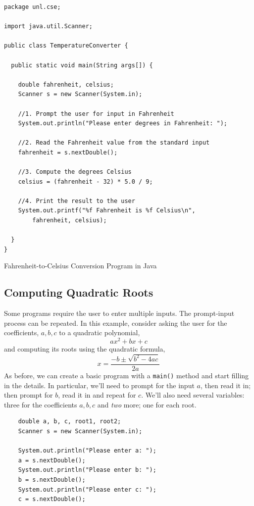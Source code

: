 \begin{listing}[!h]
\begin{verbatim}
package unl.cse;

import java.util.Scanner;

public class TemperatureConverter {

  public static void main(String args[]) {

    double fahrenheit, celsius;
    Scanner s = new Scanner(System.in);

    //1. Prompt the user for input in Fahrenheit
    System.out.println("Please enter degrees in Fahrenheit: ");
      
    //2. Read the Fahrenheit value from the standard input
    fahrenheit = s.nextDouble();
      
    //3. Compute the degrees Celsius
    celsius = (fahrenheit - 32) * 5.0 / 9;
      
    //4. Print the result to the user
    System.out.printf("%f Fahrenheit is %f Celsius\n", 
    	fahrenheit, celsius);

  }
}
\end{verbatim}
\caption{Fahrenheit-to-Celsius Conversion Program in Java}
\label{code:java:fahrenheitToCelsiusProgram}
\end{listing}

\subsection{Computing Quadratic Roots}

Some programs require the user to enter multiple inputs.  The 
prompt-input process can be repeated.  In this example, consider asking
the user for the coefficients, $a, b, c$ to a quadratic polynomial, 
  $$ax^2 + bx + c$$
and computing its roots using the quadratic formula, 
  $$x = \frac{-b \pm \sqrt{b^2 - 4ac}}{2a}$$
As before, we can create a basic program with a \texttt{main()}
method and start filling in the details.  In particular, we'll need to prompt
for the input $a$, then read it in; then prompt for $b$, read it in and
repeat for $c$.  We'll also need several variables: three for the coefficients
$a, b, c$ and \emph{two} more; one for each root. 

\begin{verbatim}
    double a, b, c, root1, root2;
    Scanner s = new Scanner(System.in);

    System.out.println("Please enter a: ");
    a = s.nextDouble();
    System.out.println("Please enter b: ");
    b = s.nextDouble();
    System.out.println("Please enter c: ");
    c = s.nextDouble();
\end{verbatim}

